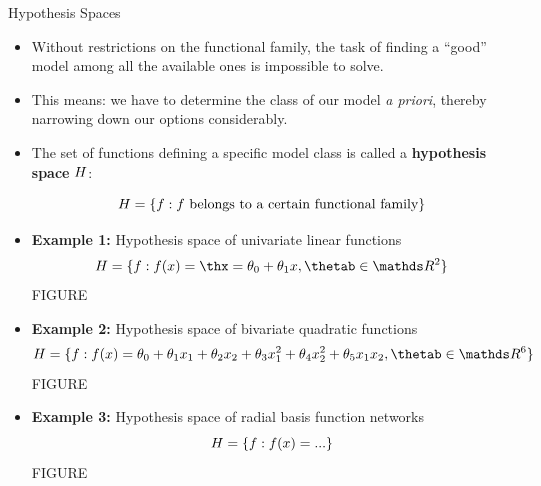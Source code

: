 \documentclass[11pt,compress,t,notes=noshow, xcolor=table]{beamer}
\begin{document}

\begin{vbframe}{Hypothesis Spaces}

\begin{itemize}

  \item Without restrictions on the functional family, the task of finding a 
  \enquote{good} model among all the available ones is impossible to solve.
  
  \item This means: we have to determine the class of our model \emph{a priori}, 
  thereby narrowing down our options considerably.
  
  \item The set of functions defining a specific model class is called a 
  \textbf{hypothesis space} $H$:
  
  $$H = \{f: f \text{ belongs to a certain functional family}\}$$
  
  \framebreak
  
  \item \textbf{Example 1:} Hypothesis space of univariate linear functions
  $$\Hspace = \{f: \fx = \thx =  \theta_0 + \theta_1 x, \thetab \in \R^2\}$$
  \color{red} {FIGURE}
  \color{black}
  
  \framebreak
  
  \item \textbf{Example 2:} Hypothesis space of bivariate quadratic functions
  $$\Hspace = \{f: \fx =  \theta_0 + \theta_1 x_1 + \theta_2 x_2 +
  \theta_3 x_1^2 + \theta_4 x_2^2 + \theta_5 x_1 x_2, \thetab \in \R^6\}$$
  \color{red} {FIGURE}
  \color{black}
  
  \framebreak
  
  \item \textbf{Example 3:} Hypothesis space of radial basis function networks
  $$H = \{f: f(x) =  ...\}$$
  \color{red} {FIGURE}
  \color{black}

\end{itemize}  

\end{vbframe}

\end{document}
